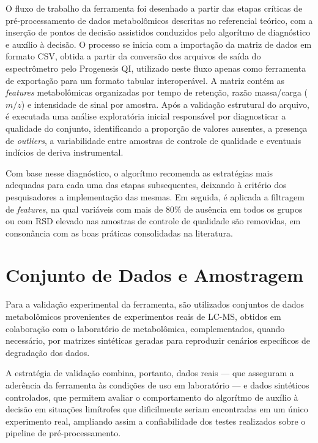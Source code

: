 O fluxo de trabalho da ferramenta foi desenhado a partir das etapas críticas de pré-processamento de dados metabolômicos descritas no referencial teórico, com a inserção de pontos de decisão assistidos conduzidos pelo algorítmo de diagnóstico e auxílio à decisão. O processo se inicia com a importação da matriz de dados em formato CSV, obtida a partir da conversão dos arquivos de saída do espectrômetro pelo Progenesis QI, utilizado neste fluxo apenas como ferramenta de exportação para um formato tabular interoperável. A matriz contém as \textit{features} metabolômicas organizadas por tempo de retenção, razão massa/carga ($m/z$) e intensidade de sinal por amostra. Após a validação estrutural do arquivo, é executada uma análise exploratória inicial responsável por diagnosticar a qualidade do conjunto, identificando a proporção de valores ausentes, a presença de \textit{outliers}, a variabilidade entre amostras de controle de qualidade e eventuais indícios de deriva instrumental.
 
Com base nesse diagnóstico, o algorítmo recomenda as estratégias mais adequadas para cada uma das etapas subsequentes, deixando à critério dos pesquisadores a implementação das mesmas. Em seguida, é aplicada a filtragem de \textit{features}, na qual variáveis com mais de 80\% de ausência em todos os grupos ou com RSD elevado nas amostras de controle de qualidade são removidas, em consonância com as boas práticas consolidadas na literatura.
 
\section{Conjunto de Dados e Amostragem}
 
Para a validação experimental da ferramenta, são utilizados conjuntos de dados metabolômicos provenientes de experimentos reais de LC-MS, obtidos em colaboração com o laboratório de metabolômica, complementados, quando necessário, por matrizes sintéticas geradas para reproduzir cenários específicos de degradação dos dados.
  
A estratégia de validação combina, portanto, dados reais --- que asseguram a aderência da ferramenta às condições de uso em laboratório --- e dados sintéticos controlados, que permitem avaliar o comportamento do algorítmo de auxílio à decisão em situações limítrofes que dificilmente seriam encontradas em um único experimento real, ampliando assim a confiabilidade dos testes realizados sobre o pipeline de pré-processamento.